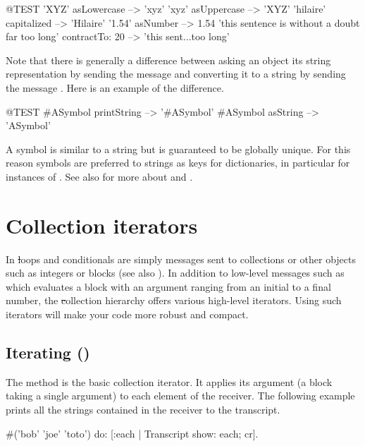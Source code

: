 \documentclass[a4paper,10pt,twoside]{book}
\begin{document}
\begin{code}{@TEST}
'XYZ' asLowercase --> 'xyz'
'xyz' asUppercase   --> 'XYZ'
'hilaire' capitalized   --> 'Hilaire'
'1.54' asNumber      --> 1.54
'this sentence is without a doubt far too long' contractTo: 20 --> 'this sent...too long'
\end{code}

Note that there is generally a difference between asking an object its string representation by sending the message  and converting it to a string by sending the message .
Here is an example of the difference.

\begin{code}{@TEST}
#ASymbol printString --> '#ASymbol'
#ASymbol asString    --> 'ASymbol'
\end{code}

A symbol is similar to a string but is guaranteed to be globally unique.  For this reason symbols are preferred to strings as keys for dictionaries, in particular for instances of .
See also  for more about  and .

\section{Collection iterators}
\label{sec:iterators}

In \st loops and conditionals are simply messages sent to collections or other objects such as integers or blocks (see also ). In addition to low-level messages such as  which evaluates a block with an argument ranging from an initial to a final number, the \st collection hierarchy offers various high-level iterators. Using such iterators will make your code more robust and compact. 

\subsection{Iterating ()}
The method  is the basic collection iterator. It applies its argument (a block taking a single argument) to each element of the receiver.
The following example prints all the strings contained in the receiver to the transcript.

\begin{code}{}
#('bob' 'joe' 'toto') do: [:each | Transcript show: each; cr].
\end{code}
\end{document}
